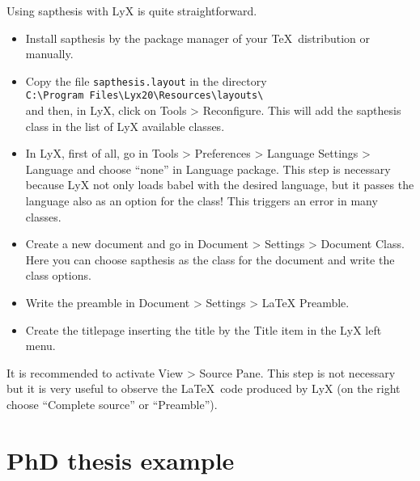 \documentclass[a5paper,11pt]{article}
\newcommand{\bs}{\textbackslash}
\begin{document}
Using \textsf{sapthesis} with LyX is quite straightforward.
\begin{itemize}
\item
Install \textsf{sapthesis} by the package manager of your \TeX\ distribution or manually.

\item
Copy the file \texttt{sapthesis.layout} in the directory\\ \texttt{C:\bs Program Files\bs Lyx20\bs Resources\bs layouts\bs}\\ and then, in LyX, click on \textsf{Tools > Reconfigure}. This will add the \textsf{sapthesis} class in the list of LyX available classes.

\item
In LyX, first of all, go in \textsf{Tools > Preferences > Language Settings > Language} and choose ``none'' in Language package. This step is necessary because LyX not only loads babel with the desired language, but it passes the language also as an option for the class! This triggers an error in many classes.

\item 
Create a new document and go in \textsf{Document > Settings > Document Class}. Here you can choose \textsf{sapthesis} as the class for the document and write the class options.

\item 
Write the preamble in \textsf{Document > Settings > LaTeX Preamble}.

\item Create the titlepage inserting the title by the \textsf{Title} item in the LyX left menu.

\end{itemize}

It is recommended to activate \textsf{View > Source Pane}. This step is not necessary but it is very useful to observe the \LaTeX\ code produced by LyX (on the right choose ``Complete source'' or ``Preamble'').





\clearpage
\section{PhD thesis example}
\label{sec:PhDexample}
\end{document}
